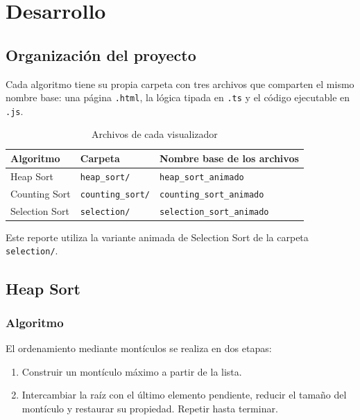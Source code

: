 \documentclass[12pt,a4paper]{article}
\begin{document}
\section{Desarrollo}

\subsection{Organización del proyecto}

Cada algoritmo tiene su propia carpeta con tres archivos que comparten el mismo nombre base: una página \texttt{.html}, la lógica tipada en \texttt{.ts} y el código ejecutable en \texttt{.js}.

\begin{table}[H]
\centering
\caption{Archivos de cada visualizador}
\begin{tabular}{lll}
\toprule
\textbf{Algoritmo} & \textbf{Carpeta} & \textbf{Nombre base de los archivos} \\
\midrule
Heap Sort & \texttt{heap\_sort/} & \texttt{heap\_sort\_animado} \\
Counting Sort & \texttt{counting\_sort/} & \texttt{counting\_sort\_animado} \\
Selection Sort & \texttt{selection/} & \texttt{selection\_sort\_animado} \\
\bottomrule
\end{tabular}
\end{table}

Este reporte utiliza la variante animada de Selection Sort de la carpeta \texttt{selection/}.

\subsection{Heap Sort}

\subsubsection{Algoritmo}

El ordenamiento mediante montículos se realiza en dos etapas:

\begin{enumerate}
    \item Construir un montículo máximo a partir de la lista.
    \item Intercambiar la raíz con el último elemento pendiente, reducir el tamaño del montículo y restaurar su propiedad. Repetir hasta terminar.
\end{enumerate}
\end{document}
